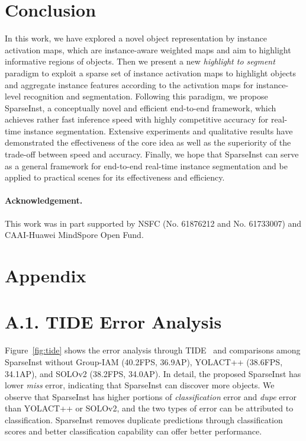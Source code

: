 \documentclass[10pt,twocolumn,letterpaper]{article}
\newcommand{\name}{SparseInst}
\begin{document}
\section{Conclusion}
In this work, we have explored a novel object representation by instance activation maps, which are instance-aware weighted maps and aim to highlight informative regions of objects.
Then we present a new \textit{highlight to segment} paradigm to exploit a sparse set of instance activation maps to highlight objects and aggregate instance features according to the activation maps for instance-level recognition and segmentation.
Following this paradigm, we propose \name{}, a conceptually novel and efficient end-to-end framework, which  achieves rather fast inference speed with highly competitive accuracy for real-time instance segmentation.
Extensive experiments and qualitative results have demonstrated the effectiveness of the core idea as well as the superiority of the trade-off between speed and accuracy.
Finally, we hope that \name{} can serve as a general framework for end-to-end real-time instance segmentation and be applied to practical scenes for its effectiveness and efficiency.
\paragraph{Acknowledgement.} This work was in part supported by NSFC (No. 61876212 and No. 61733007) and CAAI-Huawei MindSpore Open Fund.













{\small


}

\newpage
\section*{Appendix}
\section*{A.1. TIDE Error Analysis}
Figure~\ref{fig:tide} shows the error analysis through TIDE~\cite{tide-eccv2020} and comparisons among SparseInst without Group-IAM (40.2FPS, 36.9AP), YOLACT++\cite{YolactBolyaZXL19} (38.6FPS, 34.1AP), and SOLOv2\cite{SOLOV2WangZKLS20} (38.2FPS, 34.0AP).
In detail, the proposed SparseInst has lower \textit{miss} error, indicating that SparseInst can discover more objects.
We observe that SparseInst has higher portions of \textit{classification} error and \textit{dupe} error than YOLACT++ or SOLOv2, and the two types of error can be attributed to classification.
SparseInst removes duplicate predictions through classification scores and better classification capability can offer better performance.
\end{document}

